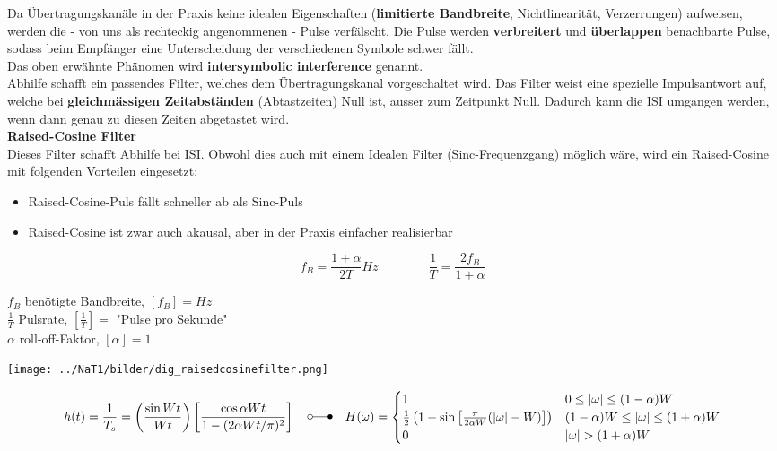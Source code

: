 \newpage
{}
Da Übertragungskanäle in der Praxis keine idealen Eigenschaften 
(\textbf{limitierte Bandbreite}, Nichtlinearität, Verzerrungen) aufweisen,
werden die - von uns als rechteckig
angenommenen - Pulse verfälscht. Die Pulse werden \textbf{verbreitert} und \textbf{überlappen}
benachbarte Pulse, sodass beim Empfänger eine Unterscheidung der verschiedenen Symbole schwer
fällt. \\
Das oben erwähnte Phänomen wird \textbf{intersymbolic interference} genannt. \\
Abhilfe schafft ein passendes Filter, welches dem Übertragungskanal vorgeschaltet wird. Das Filter
weist eine spezielle Impulsantwort auf, welche bei \textbf{gleichmässigen Zeitabständen}
(Abtastzeiten) Null ist, ausser zum Zeitpunkt Null. Dadurch kann die ISI umgangen werden, wenn dann
genau zu diesen Zeiten abgetastet wird. \\ 

\textbf{Raised-Cosine Filter } \\
Dieses Filter schafft Abhilfe bei ISI. Obwohl dies auch mit einem Idealen Filter
(Sinc-Frequenzgang) möglich wäre, wird ein Raised-Cosine mit folgenden Vorteilen eingesetzt:
\begin{itemize}
  \item Raised-Cosine-Puls fällt schneller ab als Sinc-Puls
  \item Raised-Cosine ist zwar auch akausal, aber in der Praxis einfacher realisierbar 
\end{itemize}

\begin{minipage}{9cm}
$$ f_B = \frac{1 + \alpha}{2 T} Hz \qquad \qquad \frac{1}{T} = \frac{2 f_B}{1 + \alpha}$$
\end{minipage}
\begin{minipage}{9cm}
	$f_B$ benötigte Bandbreite, $[f_B] = Hz$ \\
	$\frac{1}{T}$ Pulsrate, $[\frac{1}{T}] = $ "Pulse pro Sekunde" \\
	$\alpha$ roll-off-Faktor, $[\alpha] = 1$ 
\end{minipage}

\begin{center}  
		\texttt{[image: ../NaT1/bilder/dig\_raisedcosinefilter.png]}
\end{center}


$$ 
h(t) = \frac{1}{T_s} = \left( \frac{\sin{W t}}{W t} \right) \left[ \frac{\cos{\alpha W t}}{1
- (2 \alpha W t / \pi)^2}\right]
\quad \laplace \quad
H(\omega) = \begin{cases}
	1 			
		&  	0 \leq | \omega | \leq (1-\alpha) W       \\
	\frac{1}{2} \left( 1 - \sin\left[ \frac{\pi}{2 \alpha W} (| \omega | - W)\right] \right)      
		&	(1-\alpha) W \leq | \omega | \leq (1+\alpha) W       \\
	0
		& 	| \omega | > (1+\alpha) W
            \end{cases}
$$


